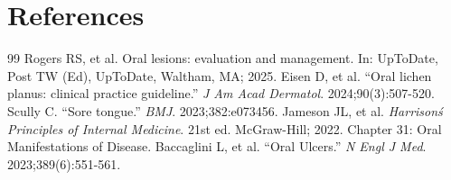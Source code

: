 \section*{References}
\begin{thebibliography}{99}
 Rogers RS, et al. Oral lesions: evaluation and management. In: UpToDate, Post TW (Ed), UpToDate, Waltham, MA; 2025.
 Eisen D, et al. ``Oral lichen planus: clinical practice guideline.'' \emph{J Am Acad Dermatol}. 2024;90(3):507-520.
 Scully C. ``Sore tongue.'' \emph{BMJ}. 2023;382:e073456.
 Jameson JL, et al. \emph{Harrison\'s Principles of Internal Medicine}. 21st ed. McGraw-Hill; 2022. Chapter 31: Oral Manifestations of Disease.
 Baccaglini L, et al. ``Oral Ulcers.'' \emph{N Engl J Med}. 2023;389(6):551-561.
\end{thebibliography}
